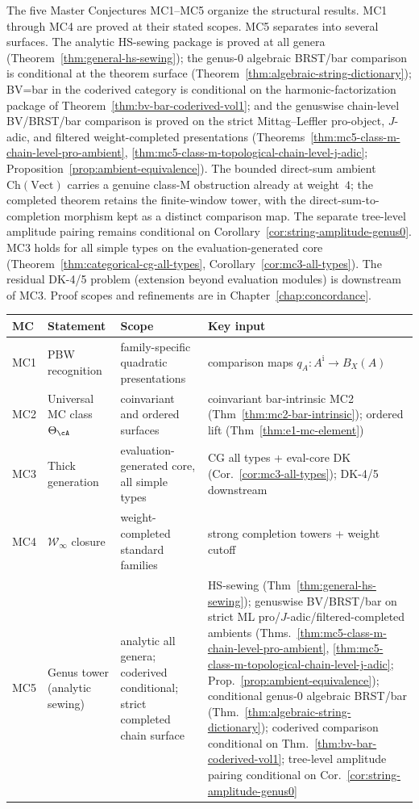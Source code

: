 The five Master Conjectures MC1--MC5 organize the structural results.
MC1 through MC4 are proved at their stated scopes. MC5 separates into
several surfaces. The analytic HS-sewing package is proved at all
genera (Theorem~\ref{thm:general-hs-sewing}); the genus-$0$
algebraic BRST/bar comparison is conditional at the theorem surface
(Theorem~\ref{thm:algebraic-string-dictionary}); BV=bar in the
coderived category is conditional on the harmonic-factorization package
of Theorem~\ref{thm:bv-bar-coderived-vol1}; and the genuswise
chain-level BV/BRST/bar comparison is proved on the strict
Mittag--Leffler pro-object, $J$-adic, and filtered weight-completed
presentations (Theorems~\ref{thm:mc5-class-m-chain-level-pro-ambient},
\ref{thm:mc5-class-m-topological-chain-level-j-adic};
Proposition~\ref{prop:ambient-equivalence}). The bounded direct-sum
ambient $\mathrm{Ch}(\mathrm{Vect})$ carries a genuine class-M
obstruction already at weight~$4$; the completed theorem retains the
finite-window tower, with the direct-sum-to-completion morphism kept as
a distinct comparison map. The separate
tree-level amplitude pairing remains conditional on
Corollary~\ref{cor:string-amplitude-genus0}. MC3 holds for all simple
types on the evaluation-generated core
(Theorem~\ref{thm:categorical-cg-all-types},
Corollary~\ref{cor:mc3-all-types}). The residual DK-4/5 problem
(extension beyond evaluation modules) is downstream of MC3. Proof
scopes and refinements are in Chapter~\ref{chap:concordance}.

\begin{center}
\small
\begin{tabular}{@{}p{}p{}p{}p{}@{}}
\textbf{MC} & \textbf{Statement} & \textbf{Scope} & \textbf{Key input} \\ \hline
MC1 & PBW recognition & family-specific quadratic presentations & comparison maps $q_A\colon A^{\mathrm i}\to B_X(A)$ \\[2pt]
MC2 & Universal MC class $\Theta_\cA$ & coinvariant and ordered surfaces & coinvariant bar-intrinsic MC2 (Thm~\ref{thm:mc2-bar-intrinsic}); ordered lift (Thm~\ref{thm:e1-mc-element}) \\[2pt]
MC3 & Thick generation & evaluation-generated core, all simple types & CG all types + eval-core DK (Cor.~\ref{cor:mc3-all-types}); DK-4/5 downstream \\[2pt]
MC4 & $\mathcal{W}_\infty$ closure & weight-completed standard families & strong completion towers + weight cutoff \\[2pt]
MC5 & Genus tower (analytic sewing) & analytic all genera; coderived conditional; strict completed chain surface & HS-sewing (Thm~\ref{thm:general-hs-sewing}); genuswise BV/BRST/bar on strict ML pro/$J$-adic/filtered-completed ambients \textup{(}Thms.~\ref{thm:mc5-class-m-chain-level-pro-ambient}, \ref{thm:mc5-class-m-topological-chain-level-j-adic}; Prop.~\ref{prop:ambient-equivalence}\textup{)}; conditional genus-$0$ algebraic BRST/bar (Thm.~\ref{thm:algebraic-string-dictionary}); coderived comparison conditional on Thm.~\ref{thm:bv-bar-coderived-vol1}; tree-level amplitude pairing conditional on Cor.~\ref{cor:string-amplitude-genus0}
\end{tabular}
\end{center}

